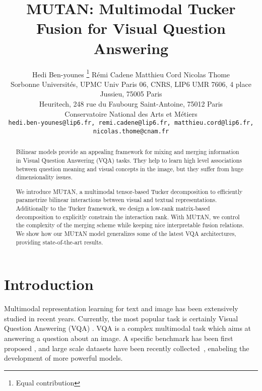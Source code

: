 \documentclass[10pt,twocolumn,letterpaper]{article}
\begin{document}
\title{MUTAN: Multimodal Tucker Fusion for Visual Question Answering}

\author{Hedi Ben-younes  \thanks{Equal contribution}
\qquad 
R\'emi Cadene \footnotemark[1] 
\qquad  
Matthieu Cord   
\qquad 
Nicolas Thome  
\\  Sorbonne Universit\'es, UPMC Univ Paris 06, CNRS, LIP6 UMR 7606, 4 place Jussieu, 75005 Paris
\\  Heuritech, 248 rue du Faubourg Saint-Antoine, 75012 Paris 
\\  Conservatoire National des Arts et M\'etiers
\\  {\tt\small hedi.ben-younes@lip6.fr, remi.cadene@lip6.fr, matthieu.cord@lip6.fr, nicolas.thome@cnam.fr}
}
\maketitle


\vspace{-0.2cm}
\begin{abstract}
Bilinear models provide an appealing framework for mixing and merging information in Visual Question Answering (VQA) tasks.
They help to learn high level associations between question meaning and visual concepts in the image, but they suffer from huge dimensionality issues.  

We introduce MUTAN, a multimodal tensor-based Tucker decomposition to efficiently parametrize bilinear interactions between visual and textual representations. 
Additionally to the Tucker framework, we design a low-rank matrix-based decomposition to explicitly constrain the interaction rank. With MUTAN, we control the complexity of the merging 
scheme while keeping nice interpretable fusion relations. We show how our MUTAN model generalizes some of the latest VQA architectures, providing state-of-the-art results.
\end{abstract}
\vspace{-0.2cm}
\section{Introduction}

Multimodal representation learning for text and image has been extensively studied in recent years. Currently,  the most popular task is certainly Visual Question Answering (VQA) \cite{Malinowski2014, VQA}. VQA is a complex multimodal task which aims at answering a question about an image. 
A specific benchmark has been first proposed \cite{Malinowski2014}, and large scale datasets have been recently collected~\cite{DBLP:conf/nips/RenKZ15,VQA,zhu2016cvpr}, enabeling the development of more powerful models. 
\end{document}
